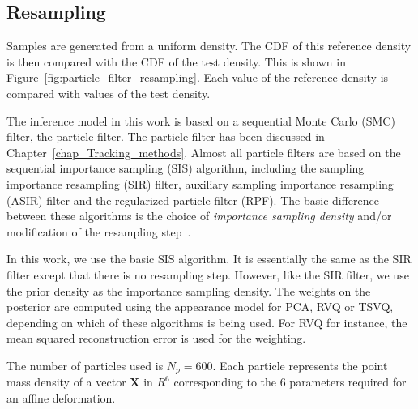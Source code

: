 \subsection{Resampling}
Samples are generated from a uniform density.  The CDF of this reference density is then compared with the CDF of the test density.  This is shown in Figure~\ref{fig:particle_filter_resampling}.  Each value of the reference density is compared with values of the test density. 
	
The inference model in this work is based on a sequential Monte Carlo (SMC) filter, the particle filter.  The particle filter has been discussed in Chapter~\ref{chap_Tracking_methods}.  Almost all particle filters are based on the sequential importance sampling (SIS) algorithm, including the sampling importance resampling (SIR) filter, auxiliary sampling importance resampling (ASIR) filter and the regularized particle filter (RPF).  The basic difference between these algorithms is the choice of \emph{importance sampling density} and/or modification of the resampling step~\cite{2002_JNL_PF_Arulampalam}.  

In this work, we use the basic SIS algorithm.  It is essentially the same as the SIR filter except that there is no resampling step.  However, like the SIR filter, we use the prior density as the importance sampling density.  The weights on the posterior are computed using the appearance model for PCA, RVQ or TSVQ, depending on which of these algorithms is being used.  For RVQ for instance, the mean squared reconstruction error is used for the weighting.

The number of particles used is $N_p=600$.  Each particle represents the point mass density of a vector $\mathbf{X}$ in $R^6$ corresponding to the 6 parameters required for an affine deformation.

\cite{1992_JNL_MCMC_Carlin}


